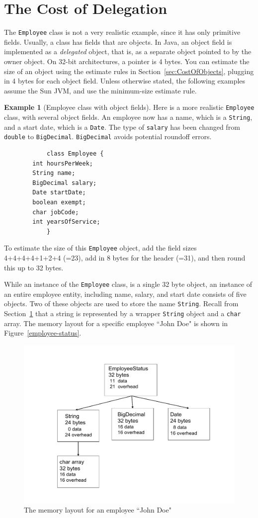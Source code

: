 \documentclass{book}
\theoremstyle{definition}
\newtheorem{example}{Example}
\begin{document}
\section{The Cost of Delegation}

The \texttt{Employee} class is not a very realistic example, since it has only primitive fields. Usually, a class has fields that are objects.  In Java, an object field is implemented as a \textit{delegated} object, that is, as a separate object pointed to by the owner object. On 32-bit architectures, a pointer is 4 bytes. You can estimate the size of an object using the estimate rules in Section~\ref{sec:CostOfObjects}, plugging in 4 bytes for each object field. Unless otherwise stated, the following examples assume the Sun JVM, and use the minimum-size estimate rule. 
\begin{example}[Employee class with object fields]
Here is a more realistic \texttt{Employee} class, with several object fields. An employee now has a name, which is a \texttt{String}, and a start date, which is a \texttt{Date}. The type of \texttt{salary} has been changed from \texttt{double} to \texttt{BigDecimal}. \texttt{BigDecimal} avoids potential roundoff errors.
\ttfamily
\begin{verbatim} 
			class Employee {
        int hoursPerWeek;
        String name;
        BigDecimal salary;
        Date startDate;
        boolean exempt;
        char jobCode;
        int yearsOfService;
			}
\end{verbatim}
\normalfont
To estimate the size of this \texttt{Employee} object, add the field sizes 4+4+4+4+1+2+4 (=23), add in 8 bytes for the header (=31), and then round this up to 32 bytes. 
\end{example}

While an instance of the \texttt{Employee} class, is a single 32 byte object, an instance of an entire employee entity, including name, salary, and start date consists of five objects. Two of these objects are used to store the name \texttt{String}. Recall from Section~\ref{} that a string is represented by a wrapper \texttt{String} object and a \texttt{char} array. The memory layout for a specific employee ``John Doe" is shown in Figure~\ref{employee-status}. 
 \begin{figure}
  \centering
 \includegraphics[width=.60\textwidth]{Figures/chapter4/employee-status.pdf}
  \caption{The memory layout for an employee ``John Doe"}
  \label{fig:employee-status}
\end{figure}
\end{document}

